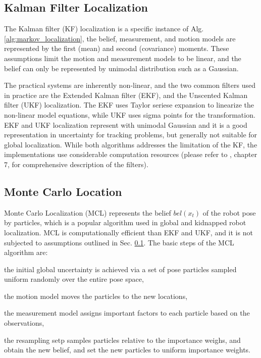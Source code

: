 \documentclass[10pt,journal,compsoc]{IEEEtran}
\begin{document}
\subsection{Kalman Filter Localization}
\label{sub:kfl}

The Kalman filter (KF) localization is a specific instance of Alg. \ref{alg:markov_localization}, the belief, measurement, and motion models are represented by the first (mean) and second (covariance) moments.  These assumptions limit the motion and measurement models to be linear, and the belief can only be represented by unimodal distribution such as a Gaussian. 

The practical systems are inherently non-linear, and the two common filters used in practice are the Extended Kalman filter (EKF), and the Unscented Kalman filter (UKF) localization. The EKF uses Taylor seriese expansion to linearize the non-linear model equations, while UKF uses sigma points for the transformation.  EKF and UKF localization represent with unimodal Gaussian and it is a good representation in uncertainty  for tracking problems, but generally not suitable for global localization. While  both algorithms addresses the limitation of the KF, the implementations use considerable computation resources (please refer to \cite{Thrun:2005:PR:1121596}, chapter 7, for comprehensive description of the filters).   

\subsection{Monte Carlo Location}
\label{sub:mcl}

Monte Carlo Localization (MCL) represents the belief $bel(x_t)$ of the robot pose by particles, which is a popular algorithm used in global and kidnapped robot localization.  MCL is computationally efficient than EKF and UKF, and it is not subjected to assumptions outlined in Sec. \ref{sub:kfl}. The basic steps of the MCL algorithm are:   \begin{enumerate*} \item the initial global uncertainty is achieved via a set of pose particles sampled uniform randomly over the entire pose space, \item the motion model moves the particles to the new locations, \item the measurement model assigns important factors to each particle based on the observations, \item the resampling setp samples particles relative to the importance weighs, and obtain the new belief, and set the new particles to uniform importance weights.  \end{enumerate*}
\end{document}
